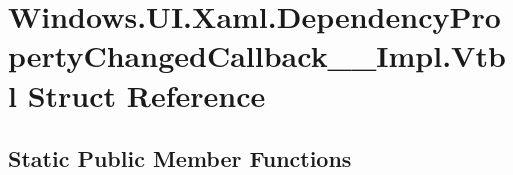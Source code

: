 \hypertarget{struct_windows_1_1_u_i_1_1_xaml_1_1_dependency_property_changed_callback_____impl_1_1_vtbl}{}\section{Windows.\+U\+I.\+Xaml.\+Dependency\+Property\+Changed\+Callback\+\_\+\+\_\+\+Impl.\+Vtbl Struct Reference}
\label{struct_windows_1_1_u_i_1_1_xaml_1_1_dependency_property_changed_callback_____impl_1_1_vtbl}
\subsection*{Static Public Member Functions}
